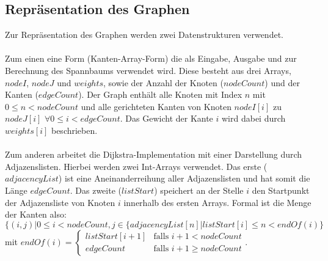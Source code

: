 \documentclass[a4paper,10pt]{article}
\begin{document}
\subsection{Repräsentation des Graphen}
Zur Repräsentation des Graphen werden zwei Datenstrukturen verwendet.\\
\\
Zum einen eine Form (Kanten-Array-Form) die als Eingabe, Ausgabe und zur Berechnung des Spannbaums verwendet wird. Diese besteht aus drei Arrays, $nodeI$, $nodeJ$ und $weights$, sowie der Anzahl der Knoten ($nodeCount$) und der Kanten ($edgeCount$). Der Graph enthält alle Knoten mit Index $n$ mit $ 0 \le n < nodeCount$ und alle gerichteten Kanten von Knoten $nodeI[i]$ zu $nodeJ[i]$ $\forall 0 \le i < edgeCount$. Das Gewicht der Kante $i$ wird dabei durch $weights[i]$ beschrieben.\\
\\
Zum anderen arbeitet die Dijkstra-Implementation mit einer Darstellung durch Adjazenslisten. Hierbei werden zwei Int-Arrays verwendet. Das erste ($adjacencyList$) ist eine Aneinanderreihung aller Adjazenslisten und hat somit die Länge $edgeCount$. Das zweite ($listStart$) speichert an der Stelle $i$ den Startpunkt der Adjazensliste von Knoten $i$ innerhalb des ersten Arrays. Formal ist die Menge der Kanten also:\\
$\{ (i,j) | 0 \le i < nodeCount, 
j \in \{adjacencyList[n]|listStart[i] \le n < endOf(i)\}$\\ mit $endOf(i) = 
\left\{
	\begin{array}{ll}
		listStart[i+1]  & \mbox{falls } i+1 < nodeCount \\
		edgeCount & \mbox{falls } i+1 \ge nodeCount
	\end{array}
\right.$.
\end{document}
